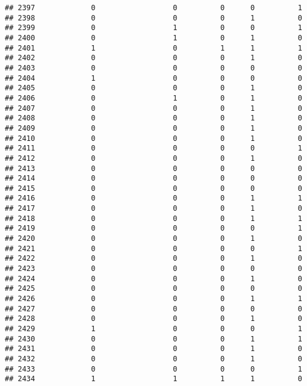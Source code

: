 \documentclass[
]{article}
\begin{document}
\begin{verbatim}
## 2397             0                  0          0      0          1
## 2398             0                  0          0      1          0
## 2399             0                  1          0      0          1
## 2400             0                  1          0      1          0
## 2401             1                  0          1      1          1
## 2402             0                  0          0      1          0
## 2403             0                  0          0      0          0
## 2404             1                  0          0      0          0
## 2405             0                  0          0      1          0
## 2406             0                  1          0      1          0
## 2407             0                  0          0      1          0
## 2408             0                  0          0      1          0
## 2409             0                  0          0      1          0
## 2410             0                  0          0      1          0
## 2411             0                  0          0      0          1
## 2412             0                  0          0      1          0
## 2413             0                  0          0      0          0
## 2414             0                  0          0      0          0
## 2415             0                  0          0      0          0
## 2416             0                  0          0      1          1
## 2417             0                  0          0      1          0
## 2418             0                  0          0      1          1
## 2419             0                  0          0      0          1
## 2420             0                  0          0      1          0
## 2421             0                  0          0      0          1
## 2422             0                  0          0      1          0
## 2423             0                  0          0      0          0
## 2424             0                  0          0      1          0
## 2425             0                  0          0      0          0
## 2426             0                  0          0      1          1
## 2427             0                  0          0      0          0
## 2428             0                  0          0      1          0
## 2429             1                  0          0      0          1
## 2430             0                  0          0      1          1
## 2431             0                  0          0      1          0
## 2432             0                  0          0      1          0
## 2433             0                  0          0      0          1
## 2434             1                  1          1      1          0

\end{verbatim}
\end{document}
